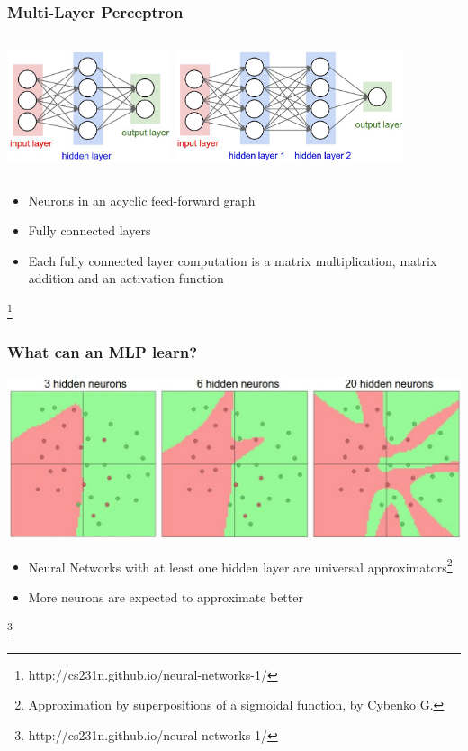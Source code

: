 \documentclass{beamer}
\newcommand\blfootnote[1]{%
  \begingroup
  \renewcommand\thefootnote{}\footnote{#1}%
  \addtocounter{footnote}{-1}%
  \endgroup
}
\begin{document}
\begin{frame}
  \frametitle{Multi-Layer Perceptron}
  \begin{columns}
  \includegraphics[height=1.3in]{neural_net.jpeg}
  \includegraphics[height=1.3in]{neural_net2.jpeg}
  \end{columns}
  \begin{itemize}
  \item Neurons in an acyclic feed-forward graph
  \item Fully connected layers
  \item Each fully connected layer computation is a matrix multiplication,
    matrix addition and an activation function
  \end{itemize}
  \blfootnote{http://cs231n.github.io/neural-networks-1/}
\end{frame}

\begin{frame}
  \frametitle{What can an MLP learn?}
  \includegraphics[width=\textwidth]{layer_sizes.jpeg}
  \begin{itemize}
  \item Neural Networks with at least one hidden layer are universal
    approximators\footnote{Approximation by superpositions of a sigmoidal function, by Cybenko G.}
  \item More neurons are expected to approximate better
  \end{itemize}
  \blfootnote{http://cs231n.github.io/neural-networks-1/}
\end{frame}
\end{document}
